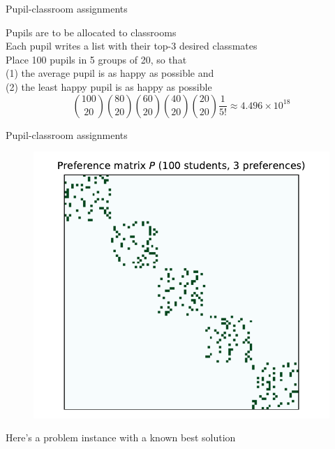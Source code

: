 \documentclass[12pt, aspectratio=149]{beamer}
\theoremstyle{plain}
\begin{document}
\begin{frame}[fragile]{Pupil-classroom assignments}
\vspace*{-1em}
\begin{center}
Pupils are to be allocated to classrooms\\
Each pupil writes a list with their top-$3$ desired classmates \\
\vspace*{2em} 
Place 100 pupils in 5 groups of 20, so that \\
(1) the average pupil is as happy as possible and \\
(2) the least happy pupil is as happy as possible
\vspace*{1em} 
\begin{equation*}
\binom{100}{20}
\binom{80}{20}
\binom{60}{20}
\binom{40}{20}
\binom{20}{20}
\frac{1}{5!} \approx 4.496 \times 10^{18}
\end{equation*}
\end{center}
\end{frame}

\begin{frame}[fragile]{Pupil-classroom assignments}
\vspace*{-1.5em}
\begin{center}
 \begin{figure}
    	\centering
    	\includegraphics[width=0.6\linewidth]{figures/classroom_matrix_structures.pdf}
 \end{figure}
 \end{center}
\vspace*{-2em}
\begin{center}
Here's a problem instance with a known best solution
\end{center}
\end{frame}
\end{document}
